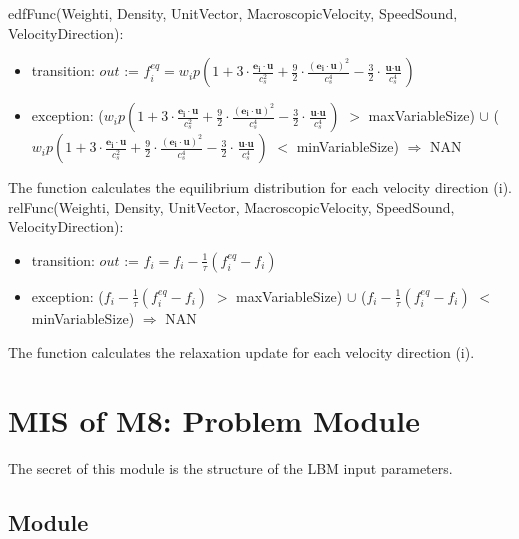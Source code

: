 \documentclass[12pt, titlepage]{article}
\begin{document}
\noindent edfFunc(Weighti, Density, UnitVector, MacroscopicVelocity, SpeedSound, VelocityDirection):
\begin{itemize}
	\item transition: $out$ := $f_{i}^{eq} = w_{i}p(1 + 3 \cdot \frac{\textbf{e}_\textbf{i}\cdot\textbf{u}}{c_s^2}+\frac{9}{2} \cdot \frac{(\textbf{e}_\textbf{i}\cdot\textbf{u})^2}{c_s^4}-\frac{3}{2} \cdot \frac{\textbf{u}\cdot\textbf{u}}{c_s^4})$
	\item exception: ($w_{i}p(1 + 3 \cdot \frac{\textbf{e}_\textbf{i}\cdot\textbf{u}}{c_s^2}+\frac{9}{2} \cdot \frac{(\textbf{e}_\textbf{i}\cdot\textbf{u})^2}{c_s^4}-\frac{3}{2} \cdot \frac{\textbf{u}\cdot\textbf{u}}{c_s^4})$ $>$ maxVariableSize) $\cup$ ($w_{i}p(1 + 3 \cdot \frac{\textbf{e}_\textbf{i}\cdot\textbf{u}}{c_s^2}+\frac{9}{2} \cdot \frac{(\textbf{e}_\textbf{i}\cdot\textbf{u})^2}{c_s^4}-\frac{3}{2} \cdot \frac{\textbf{u}\cdot\textbf{u}}{c_s^4})$ $<$ minVariableSize) $\Rightarrow$ NAN
\end{itemize}

The function calculates the equilibrium distribution for each velocity direction (i).\\

\noindent relFunc(Weighti, Density, UnitVector, MacroscopicVelocity, SpeedSound, VelocityDirection):
\begin{itemize}
	\item transition: $out$ := $f_{i} = f_{i} - \frac{1}{\tau}(f_{i}^{eq}-f_{i})$
	\item exception: ($f_{i} - \frac{1}{\tau}(f_{i}^{eq}-f_{i})$ $>$ maxVariableSize) $\cup$ ($f_{i} - \frac{1}{\tau}(f_{i}^{eq}-f_{i})$ $<$ minVariableSize) $\Rightarrow$ NAN
\end{itemize}

The function calculates the relaxation update for each velocity direction (i).\\

\newpage

\section{MIS of M8: Problem Module} \label{PRModule}

The secret of this module is the structure of the LBM input parameters.

\subsection{Module}
\end{document}
